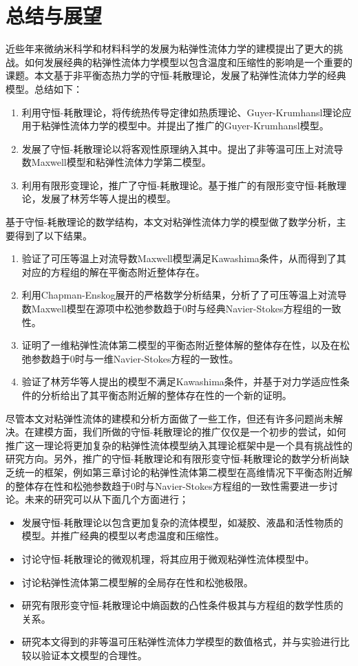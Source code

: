 \chapter{总结与展望}

% 
近些年来微纳米科学和材料科学的发展为粘弹性流体力学的建模提出了更大的挑战。如何发展经典的粘弹性流体力学模型以包含温度和压缩性的影响是一个重要的课题。本文基于非平衡态热力学的守恒-耗散理论，发展了粘弹性流体力学的经典模型。总结如下：
\begin{enumerate}
	\item 利用守恒-耗散理论，将传统热传导定律如热质理论、Guyer-Krumhansl理论应用于粘弹性流体力学的模型中。并提出了推广的Guyer-Krumhansl模型。
	\item 发展了守恒-耗散理论以将客观性原理纳入其中。提出了非等温可压上对流导数Maxwell模型和粘弹性流体力学第二模型。
	\item 利用有限形变理论，推广了守恒-耗散理论。基于推广的有限形变守恒-耗散理论，发展了林芳华等人提出的模型。
\end{enumerate}
基于守恒-耗散理论的数学结构，本文对粘弹性流体力学的模型做了数学分析，主要得到了以下结果。
\begin{enumerate}
	\item 验证了可压等温上对流导数Maxwell模型满足Kawashima条件，从而得到了其对应的方程组的解在平衡态附近整体存在。
	\item 利用Chapman-Enskog展开的严格数学分析结果，分析了了可压等温上对流导数Maxwell模型在源项中松弛参数趋于$0$时与经典Navier-Stokes方程组的一致性。
	\item 证明了一维粘弹性流体第二模型的平衡态附近整体解的整体存在性，以及在松弛参数趋于$0$时与一维Navier-Stokes方程的一致性。
	\item 验证了林芳华等人提出的模型不满足Kawashima条件，并基于对力学适应性条件的分析给出了其平衡态附近解的整体存在性的一个新的证明。
\end{enumerate}

尽管本文对粘弹性流体的建模和分析方面做了一些工作，但还有许多问题尚未解决。在建模方面，我们所做的守恒-耗散理论的推广仅仅是一个初步的尝试，如何推广这一理论将更加复杂的粘弹性流体模型纳入其理论框架中是一个具有挑战性的研究方向。另外，推广的守恒-耗散理论和有限形变守恒-耗散理论的数学分析尚缺乏统一的框架，例如第三章讨论的粘弹性流体第二模型在高维情况下平衡态附近解的整体存在性和松弛参数趋于$0$时与Navier-Stokes方程组的一致性需要进一步讨论。未来的研究可以从下面几个方面进行；
\begin{itemize}
	\item 发展守恒-耗散理论以包含更加复杂的流体模型，如凝胶、液晶和活性物质的模型。并推广经典的模型以考虑温度和压缩性。
	\item 讨论守恒-耗散理论的微观机理，将其应用于微观粘弹性流体模型中。
	\item 讨论粘弹性流体第二模型解的全局存在性和松弛极限。
	\item 研究有限形变守恒-耗散理论中熵函数的凸性条件极其与方程组的数学性质的关系。
	\item 研究本文得到的非等温可压粘弹性流体力学模型的数值格式，并与实验进行比较以验证本文模型的合理性。
\end{itemize}

% 